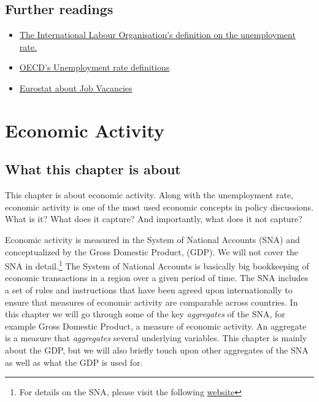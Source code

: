 \documentclass[
]{book}
\begin{document}
\hypertarget{further-readings-1}{%
\section{Further readings}\label{further-readings-1}}

\begin{itemize}
\item
  \href{https://www.ilo.org/ilostat-files/Documents/description_UR_EN.pdf}{The International Labour Organisation's definition on the unemployment rate.}
\item
  \href{https://data.oecd.org/unemp/unemployment-rate.htm}{OECD's Unemployment rate definitions}
\item
  \href{https://ec.europa.eu/eurostat/cache/metadata/en/jvs_esms.htm}{Eurostat about Job Vacancies}
\end{itemize}

\hypertarget{activity}{%
\chapter{Economic Activity}\label{activity}}

\hypertarget{what-this-chapter-is-about-2}{%
\section{What this chapter is about}\label{what-this-chapter-is-about-2}}

This chapter is about economic activity. Along with the unemployment rate, economic activity is one of the most used economic concepts in policy discussions. What is it? What does it capture? And importantly, what does it not capture?

Economic activity is measured in the System of National Accounts (SNA) and conceptualized by the Gross Domestic Product, (GDP). We will not cover the SNA in detail.\footnote{For details on the SNA, please visit the following \href{https://unstats.un.org/unsd/nationalaccount/sna.asp}{website}} The System of National Accounts is basically big bookkeeping of economic transactions in a region over a given period of time. The SNA includes a set of rules and instructions that have been agreed upon internationally to ensure that measures of economic activity are comparable across countries. In this chapter we will go through some of the key \emph{aggregates} of the SNA, for example Gross Domestic Product, a measure of economic activity. An aggregate is a measure that \emph{aggregates} several underlying variables. This chapter is mainly about the GDP, but we will also briefly touch upon other aggregates of the SNA as well as what the GDP is used for.
\end{document}
